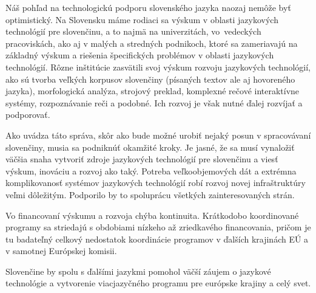 \begin{multicols}{2}
Náš pohľad na technologickú podporu slovenského jazyka naozaj nemôže byť
optimistický. Na Slovensku máme rodiaci sa výskum v oblasti jazykových
technológií pre slovenčinu, a to najmä na univerzitách, vo~vedeckých
pracoviskách, ako aj v malých a stredných podnikoch, ktoré sa zameriavajú na
základný výskum a riešenia špecifických problémov v oblasti jazykových
technológií. Rôzne inštitúcie zasvätili svoj výskum rozvoju jazykových
technológií, ako sú tvorba veľkých korpusov slovenčiny (písaných textov ale aj
hovoreného jazyka), morfologická analýza, strojový preklad, komplexné
rečové interaktívne systémy, rozpoznávanie reči a podobné.  Ich rozvoj je však
nutné ďalej rozvíjať a podporovať.

Ako uvádza táto správa, skôr ako bude možné urobiť nejaký posun v spracovávaní
slovenčiny, musia sa podniknúť okamžité kroky. Je jasné, že sa musí vynaložiť
väčšia snaha vytvoriť zdroje jazykových technológií pre slovenčinu a viesť
výskum, inováciu a rozvoj ako taký. Potreba veľkoobjemových dát a extrémna
komplikovanosť systémov jazykových technológií robí rozvoj novej infraštruktúry
veľmi dôležitým. Podporilo by to spoluprácu všetkých zainteresovaných strán.

Vo financovaní výskumu a rozvoja chýba kontinuita. Krátkodobo koordinované
programy sa striedajú s obdobiami nízkeho až zriedkavého financovania, pričom
je tu badateľný celkový nedostatok koordinácie programov v ďalších krajinách EÚ
a v samotnej Európskej komisii.

Slovenčine by spolu s ďalšími jazykmi pomohol väčší záujem o jazykové technológie a vytvorenie viacjazyčného programu pre európske krajiny a celý svet\cite{f32}.

\end{multicols}

\clearpage

